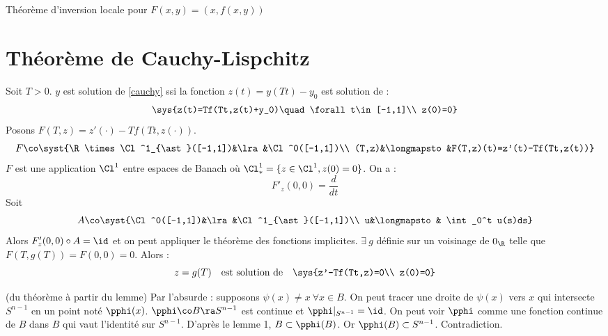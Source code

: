 \prvv
Théorème d'inversion locale pour $F(x,y)=(x,f(x,y))$
\prvf

\newpage\section{Théorème de Cauchy-Lispchitz}

\prvv
Soit $T>0$. $y$ est solution de \eqref{cauchy} ssi la fonction $z(t)=y(Tt)-y_0$ est solution de :
$$\sys{z(t)=Tf(Tt,z(t)+y_0)\quad\forall t\in[-1,1]\\ z(0)=0}$$
Posons $F(T,z)=z'(\cdot)-Tf(Tt,z(\cdot))$. 
$$F\co\syst{\R\times\Cl^1_{\ast}([-1,1])&\lra&\Cl^0([-1,1])\\ 
(T,z)&\longmapsto&F(T,z)(t)=z'(t)-Tf(Tt,z(t))}$$
$F$ est une application $\Cl^1$ entre espaces de Banach où $\Cl^1_{\ast}=\{z\in\Cl^1, z(0)=0\}$. On a :
$$F'_z(0,0)=\frac{d}{dt}$$
Soit 
$$A\co\syst{\Cl^0([-1,1])&\lra&\Cl^1_{\ast}([-1,1])\\ u&\longmapsto & \int_0^t u(s)ds}$$
Alors $F'_z(0,0)\circ A=\id$ et on peut appliquer le théorème des fonctions implicites. $\exists\ g$ définie sur un voisinage de $0_\R$ telle que $F(T,g(T))=F(0,0)=0$. Alors :
$$z=g(T)\quad\text{est solution de}\quad\sys{z'-Tf(Tt,z)=0\\ z(0)=0}$$
\prvf


\prv (du théorème à partir du lemme)
\dl Par l'absurde : supposons $\psi(x)\neq x\ \forall x\in B$. On peut tracer une droite de $\psi(x)$ vers $x$ qui intersecte $S^{n-1}$ en un point noté $\pphi(x)$. $\pphi\co B\ra S^{n-1}$ est continue et $\pphi|_{S^{n-1}}=\id$. On peut voir $\pphi$ comme une fonction continue de $B$ dans $B$ qui vaut l'identité sur $S^{n-1}$. D'après le lemme 1, $B\subset\pphi(B)$. Or $\pphi(B)\subset S^{n-1}$. Contradiction.
\prvf

